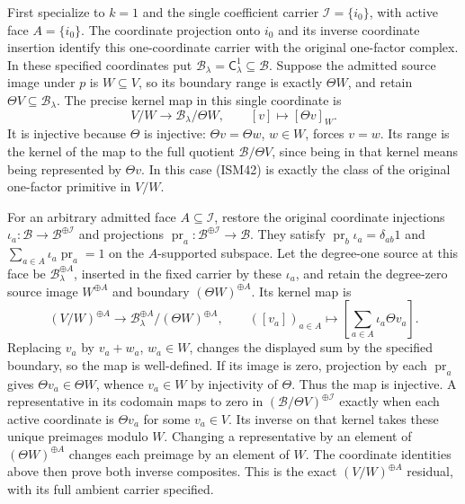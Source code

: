 First specialize to \(k=1\) and the single coefficient
carrier \(\mathscr I=\{i_0\}\), with active face
\(A=\{i_0\}\).  The coordinate projection onto \(i_0\)
and its inverse coordinate insertion identify this
one-coordinate carrier with the original one-factor
complex.  In these specified coordinates put
\(\mathscr B_\lambda=\mathsf C_\lambda^1
\subseteq\mathscr B\).  Suppose the admitted source
image under \(p\) is \(W\subseteq V\), so its
boundary range is exactly \(\Theta W\), and retain
\(\Theta V\subseteq\mathscr B_\lambda\).
The precise kernel map in this single coordinate is
\[
 V/W\longrightarrow\mathscr B_\lambda/\Theta W,
 \qquad [v]\longmapsto[\Theta v]_W.
 \tag{ISM43}
\]
It is injective because \(\Theta\) is injective:
\(\Theta v=\Theta w\), \(w\in W\), forces \(v=w\).
Its range is the kernel of the map to the full
quotient \(\mathscr B/\Theta V\), since being in
that kernel means being represented by
\(\Theta v\).  In this case (ISM42) is exactly
the class of the original one-factor primitive
in \(V/W\).

For an arbitrary admitted face \(A\subseteq\mathscr I\),
restore the original coordinate injections
\(\iota_a:\mathscr B\to\mathscr B^{\oplus\mathscr I}\)
and projections
\(\operatorname{pr}_a:\mathscr B^{\oplus\mathscr I}
\to\mathscr B\).  They satisfy
\(\operatorname{pr}_b\iota_a=\delta_{ab}1\) and
\(\sum_{a\in A}\iota_a\operatorname{pr}_a=1\)
on the \(A\)-supported subspace.
Let the degree-one source at this face be
\(\mathscr B_\lambda^{\oplus A}\), inserted in the
fixed carrier by these \(\iota_a\), and retain the
degree-zero source image \(W^{\oplus A}\) and
boundary \((\Theta W)^{\oplus A}\).  Its kernel map is
\[
 (V/W)^{\oplus A}\longrightarrow
 \mathscr B_\lambda^{\oplus A}/(\Theta W)^{\oplus A},
 \qquad
 ([v_a])_{a\in A}\longmapsto
 \left[\sum_{a\in A}\iota_a\Theta v_a\right].
\]
Replacing \(v_a\) by \(v_a+w_a\), \(w_a\in W\),
changes the displayed sum by the specified
boundary, so the map is well-defined.  If its
image is zero, projection by each
\(\operatorname{pr}_a\) gives
\(\Theta v_a\in\Theta W\), whence \(v_a\in W\)
by injectivity of \(\Theta\).  Thus the map is
injective.  A representative in its codomain maps
to zero in
\((\mathscr B/\Theta V)^{\oplus\mathscr I}\)
exactly when each active coordinate is
\(\Theta v_a\) for some \(v_a\in V\).
Its inverse on that kernel takes these unique
preimages modulo \(W\).  Changing a representative
by an element of \((\Theta W)^{\oplus A}\)
changes each preimage by an element of \(W\).
The coordinate identities above then prove both
inverse composites.  This is the exact
\((V/W)^{\oplus A}\) residual, with its full
ambient carrier specified.

